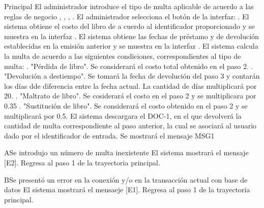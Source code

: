 \begin{UCtrayectoria}{Principal}
	\UCpaso[\UCactor] El administrador introduce el tipo de multa aplicable de acuerdo a las reglas de negocio , , , .
	\UCpaso[\UCactor] El administrador selecciona el botón  de la interfaz: . 
	\UCpaso[\UCsist] El sistema obtiene el costo del libro de a cuerdo al identificador proporcionado y se muestra en la interfaz . 
	\UCpaso[\UCsist] El sistema obtiene las fechas de préstamo y de devolución establecidas en la emisión anterior y se muestra en la interfaz . 
	\UCpaso[\UCsist] El sistema calcula la multa de acuerdo a las siguientes condiciones, correspondientes al tipo de multa: . "Pérdida de libro". Se considerará el costo total obtenido en el paso 2. . "Devolución a destiempo". Se tomará la fecha de devolución del paso 3 y contarán los días dde diferencia entre la fecha actual. La cantidad de días multiplicará por 20. . "Maltrato de libro". Se cosiderará el costo en el paso 2 y se multiplicara por 0.35 . "Sustitución de libro". Se considerará el costo obtenido en el paso 2 y se multiplicará por 0.5.
	\UCpaso[\UCsist] El sistema descargara el DOC-1, en el que devolverá la cantidad de multa correspondiente al paso anterior, la cual se asociará al usuario dado por el identificador de entrada.  
	\UCpaso[\UCsist] Se mostrará el mensaje MSG1
\end{UCtrayectoria}
\begin{UCtrayectoriaA}{A}{Se introdujo un número de multa inexistente}	
			\UCpaso[\UCsist] El sistema mostrará el mensaje [E2].
			\UCpaso[\UCsist] Regresa al paso 1 de la trayectoria principal. 
\end{UCtrayectoriaA}
\begin{UCtrayectoriaA}{B}{Se presentó un error en la conexión y/o en la transacción actual con base de datos}
			\UCpaso[\UCsist] El sistema mostrará el mensaeje [E1].
			\UCpaso[\UCsist] Regresa al paso 1 de la trayectoria principal.
\end{UCtrayectoriaA}
